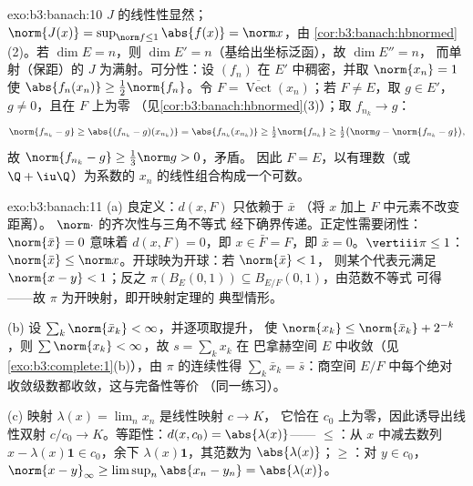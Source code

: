 \begin{solution}{exo:b3:banach:10}
$J$ 的线性性显然；$\norm{J(x)} = \sup_{\norm f \leq
1}\abs{f(x)} = \norm x$，由
\cref{cor:b3:banach:hbnormed}(2)。若 $\dim E = n$，则 $\dim E' =
n$（基给出坐标泛函），故 $\dim E'' = n$，
而单射（保距）的 $J$ 为满射。可分性：设
$(f_n)$ 在 $E'$ 中稠密，并取 $\norm{x_n} = 1$ 使
$\abs{f_n(x_n)} \geq \frac12\norm{f_n}$。令 $F =
\overline{\operatorname{Vect}}(x_n)$；若 $F \neq E$，取 $g
\in E'$，$g \neq 0$，且在 $F$ 上为零
（见\cref{cor:b3:banach:hbnormed}(3)）；取 $f_{n_k} \to g$：
\[
\norm{f_{n_k} - g} \geq \abs{(f_{n_k} - g)(x_{n_k})}
= \abs{f_{n_k}(x_{n_k})} \geq \tfrac12\norm{f_{n_k}}
\geq \tfrac12\bigl(\norm g - \norm{f_{n_k} - g}\bigr),
\]
故 $\norm{f_{n_k} - g} \geq \frac13\norm g > 0$，矛盾。
因此 $F = E$，以有理数（或 $\Q + \iu\Q$）为系数的
$x_n$ 的线性组合构成一个可数。
\end{solution}

\begin{solution}{exo:b3:banach:11}
(a) 良定义：$d(x, F)$ 只依赖于 $\bar x$
（将 $x$ 加上 $F$ 中元素不改变距离）。
$\norm\cdot$ 的齐次性与三角不等式
经下确界传递。正定性需要闭性：$\norm{\bar
x} = 0$ 意味着 $d(x, F) = 0$，即 $x \in \bar F = F$，即
$\bar x = 0$。$\vertiii\pi \leq 1$：$\norm{\bar x} \leq
\norm x$。开球映为开球：若 $\norm{\bar x} < 1$，
则某个代表元满足 $\norm{x - y} < 1$；反之
$\pi(B_E(0,1)) \subseteq B_{E/F}(0,1)$，由范数不等式
可得——故 $\pi$ 为开映射，即开映射定理的
典型情形。

(b) 设 $\sum_k\norm{\bar x_k} < \infty$，并逐项取提升，
使 $\norm{x_k} \leq \norm{\bar x_k} + 2^{-k}$，则
$\sum\norm{x_k} < \infty$，故 $s = \sum_kx_k$ 在
巴拿赫空间 $E$ 中收敛（见\cref{exo:b3:complete:1}(b)），由
$\pi$ 的连续性得 $\sum_k\bar x_k = \bar s$：商空间 $E/F$ 中每个绝对
收敛级数都收敛，这与完备性等价
（同一练习）。

(c) 映射 $\lambda(x) = \lim_nx_n$ 是线性映射 $c \to K$，
它恰在 $c_0$ 上为零，因此诱导出线性双射
$c/c_0 \to K$。等距性：$d(x, c_0) = \abs{\lambda(x)}$——
$\leq$：从 $x$ 中减去数列 $x - \lambda(x)\mathbf
1 \in c_0$，余下 $\lambda(x)\mathbf 1$，其范数为
$\abs{\lambda(x)}$；$\geq$：对 $y \in c_0$，$\norm{x -
y}_\infty \geq \limsup_n\abs{x_n - y_n} = \abs{\lambda(x)}$。
\end{solution}

